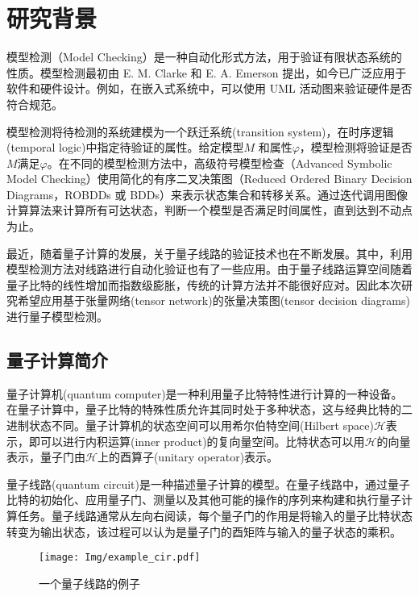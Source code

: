 \chapter{研究背景}

模型检测（Model Checking）是一种自动化形式方法，用于验证有限状态系统的性质。模型检测最初由 E. M. Clarke 和 E. A. Emerson 提出\citep{Emerson_1980,Clarke,Clarke_1986}，如今已广泛应用于软件和硬件设计。例如，在嵌入式系统中，可以使用 UML 活动图来验证硬件是否符合规范\citep{Grobelna_2015}。

模型检测将待检测的系统建模为一个跃迁系统(transition system)，在时序逻辑(temporal logic)中指定待验证的属性。给定模型\(M\) 和属性\(\varphi\)，模型检测将验证是否\(M\)满足\(\varphi\)。在不同的模型检测方法中，高级符号模型检查（Advanced Symbolic Model Checking）\citep{Grobelna_2015}使用简化的有序二叉决策图（Reduced Ordered Binary Decision Diagrams，ROBDDs 或 BDDs）\citep{Bryant_1986}来表示状态集合和转移关系。通过迭代调用图像计算算法来计算所有可达状态，判断一个模型是否满足时间属性，直到达到不动点为止。

最近，随着量子计算的发展，关于量子线路的验证技术也在不断发展\citep{viamontes2007checking,burgholzer2020advanced}。其中，利用模型检测方法对线路进行自动化验证也有了一些应用。由于量子线路运算空间随着量子比特的线性增加而指数级膨胀，传统的计算方法并不能很好应对。因此本次研究希望应用基于张量网络(tensor network)的张量决策图(tensor decision diagrams)进行量子模型检测。 

\section{量子计算简介}

量子计算机(quantum computer)是一种利用量子比特特性进行计算的一种设备。在量子计算中，量子比特的特殊性质允许其同时处于多种状态，这与经典比特的二进制状态不同。量子计算机的状态空间可以用希尔伯特空间(Hilbert space)\(\mathcal{H}\)表示\citep{nielsen2010quantum}，即可以进行内积运算(inner product)的复向量空间。比特状态可以用\(\mathcal{H}\)的向量表示，量子门由\(\mathcal{H}\)上的酉算子(unitary operator)表示。

量子线路(quantum circuit)是一种描述量子计算的模型。在量子线路中，通过量子比特的初始化、应用量子门、测量以及其他可能的操作的序列来构建和执行量子计算任务。量子线路通常从左向右阅读，每个量子门的作用是将输入的量子比特状态转变为输出状态，该过程可以认为是量子门的酉矩阵与输入的量子状态的乘积。
\begin{figure}[!htbp]
    \centering
    \texttt{[image: Img/example\_cir.pdf]}
    \caption{一个量子线路的例子}
    \label{fig:example_cir}
\end{figure}

